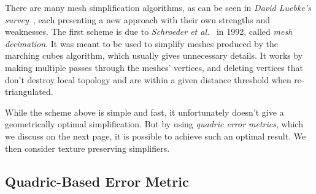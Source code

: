There are many mesh simplification algorithms, as can be seen in \emph{David Luebke's survey}~\cite{luebke2001developer}, each presenting a new approach with their own strengths and weaknesses. The first scheme is due to \emph{Schroeder et al.}~\cite{schroeder1992decimation} in 1992, called \emph{mesh decimation}. It was meant to be used to simplify meshes produced by the marching cubes algorithm, which usually gives unnecessary details. It works by making multiple passes through the meshes' vertices, and deleting vertices that don't destroy local topology and are within a given distance threshold when re-triangulated.

While the scheme above is simple and fast, it unfortunately doesn't give a geometrically optimal simplification. But by using \emph{quadric error metrics}, which we discuss on the next page, it is possible to achieve such an optimal result. We then consider texture preserving simplifiers.

\subsection{Quadric-Based Error Metric} \label{sec:quadric-based_error_metric}

